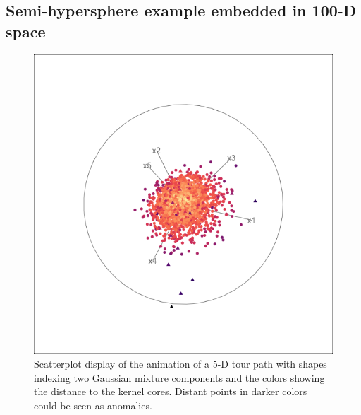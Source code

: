 \documentclass[11pt,a4paper,]{article}
\begin{document}
\hypertarget{fivedgaussian}{%
\subsection{Semi-hypersphere example embedded in 100-D space}\label{fivedgaussian}}

\begin{figure}

{\centering \includegraphics[width=0.7\linewidth]{figures/tourr_5d_semisphere} 

}

\caption{Scatterplot display of the animation of a 5-D tour path with shapes indexing two Gaussian mixture components and the colors showing the distance to the kernel cores. Distant points in darker colors could be seen as anomalies.}\label{fig:fivedmeta}
\end{figure}
\end{document}
